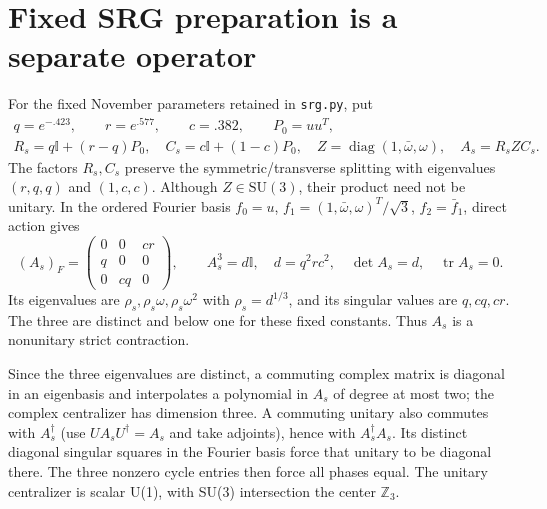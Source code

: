 \documentclass[11pt,a4paper]{article}
\numberwithin{equation}{section}
\newcommand{\tr}{\operatorname{tr}}\newcommand{\diag}{\operatorname{diag}}
\newcommand{\I}{\mathbb I}\newcommand{\Argz}{\operatorname{Arg}_0}
\begin{document}
\section{Fixed SRG preparation is a separate operator}\label{sec:srg}
For the fixed November parameters retained in \texttt{srg.py}, put
\begin{gather}
 q=e^{-.423},\qquad r=e^{.577},\qquad c=.382,\qquad P_0=uu^T,\nonumber\\
 R_s=q\I+(r-q)P_0,\quad C_s=c\I+(1-c)P_0,\quad
 Z=\diag(1,\bar\omega,\omega),\quad A_s=R_sZC_s.\label{eq:srg}
\end{gather}
The factors $R_s,C_s$ preserve the symmetric/transverse splitting with eigenvalues $(r,q,q)$ and $(1,c,c)$. Although $Z\in\mathrm{SU}(3)$, their product need not be unitary. In the ordered Fourier basis $f_0=u$, $f_1=(1,\bar\omega,\omega)^T/\sqrt3$, $f_2=\bar f_1$, direct action gives
\begin{equation}\label{eq:weightedcycle}
 (A_s)_F=\begin{pmatrix}0&0&cr\\q&0&0\\0&cq&0\end{pmatrix},\qquad
 A_s^3=d\I,\quad d=q^2rc^2,\quad \det A_s=d,\quad\tr A_s=0.
\end{equation}
Its eigenvalues are $\rho_s,\rho_s\omega,\rho_s\omega^2$ with $\rho_s=d^{1/3}$, and its singular values are $q,cq,cr$. The three are distinct and below one for these fixed constants. Thus $A_s$ is a nonunitary strict contraction.

Since the three eigenvalues are distinct, a commuting complex matrix is diagonal in an eigenbasis and interpolates a polynomial in $A_s$ of degree at most two; the complex centralizer has dimension three. A commuting unitary also commutes with $A_s^\dagger$ (use $UA_sU^\dagger=A_s$ and take adjoints), hence with $A_s^\dagger A_s$. Its distinct diagonal singular squares in the Fourier basis force that unitary to be diagonal there. The three nonzero cycle entries then force all phases equal. The unitary centralizer is scalar U(1), with SU(3) intersection the center $\mathbb Z_3$.
\end{document}
